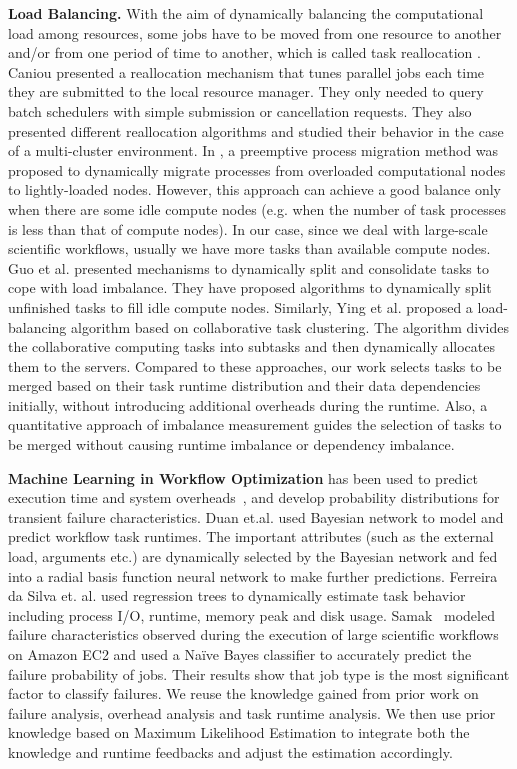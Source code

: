 \textbf{Load Balancing.} With the aim of dynamically balancing the computational load among resources, some jobs have to be moved from one resource to another and/or from one period of time to another, which is called task reallocation \cite{Tomas2012}. Caniou  \cite{Caniou2011} presented a reallocation mechanism that tunes parallel jobs each time they are submitted to the local resource manager. They only needed to query batch schedulers with simple submission or cancellation requests. They also presented different reallocation algorithms and studied their behavior in the case of a multi-cluster environment. In \cite{Zhang2000}, a preemptive process migration method was proposed to dynamically migrate processes from overloaded computational nodes to lightly-loaded nodes. However, this approach can achieve a good balance only when there are some idle compute nodes (e.g. when the number of task processes is less than that of compute nodes). In our case, since we deal with large-scale scientific workflows, usually we have more tasks than available compute nodes. 
Guo et al. \cite{Zhenhua2011} presented mechanisms to dynamically split and consolidate tasks to cope with load imbalance. They have proposed algorithms to dynamically split unfinished tasks to fill idle compute nodes. Similarly, Ying et al. \cite{Ying2009} proposed a load-balancing algorithm based on collaborative task clustering. The algorithm divides the collaborative computing tasks into subtasks and then dynamically allocates them to the servers. Compared to these approaches, our work selects tasks to be merged based on their task runtime distribution and their data dependencies initially, without introducing additional overheads during the runtime. Also, a quantitative approach of imbalance measurement guides the selection of tasks to be merged without causing runtime imbalance or dependency imbalance. 



\textbf{Machine Learning in Workflow Optimization} has been used to predict execution time \cite{Rubing2009, 1015660, 1542747, da2013toward} and system overheads~\cite{Chen2011}, and develop probability distributions for transient failure characteristics. Duan et.al. \cite{Rubing2009} used Bayesian network to model and predict workflow task runtimes. The important attributes (such as the external load, arguments etc.) are dynamically selected by the Bayesian network and fed into a radial basis function neural network to make further predictions. Ferreira da Silva et. al. \cite{da2013toward} used regression trees to dynamically estimate task behavior including process I/O, runtime, memory peak and disk usage. Samak~\cite{samak2012failure} modeled failure characteristics observed during the execution of large scientific workflows on Amazon EC2 and used a Na\"{i}ve Bayes classifier to accurately predict the failure probability of jobs. Their results show that job type is the most significant factor to classify failures. 
We reuse the knowledge gained from prior work on failure analysis, overhead analysis and task runtime analysis. We then use prior knowledge based on Maximum Likelihood Estimation to integrate both the knowledge and runtime feedbacks and adjust the estimation accordingly. 



